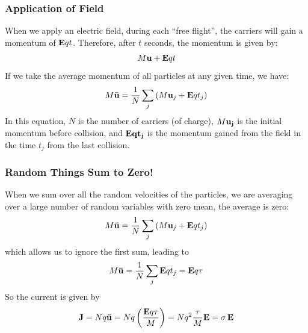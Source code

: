 \subsubsection{Application of Field}
When we apply an electric field, during each “free flight”, the carriers will gain a momentum of $ {\bf{E}}qt $.  Therefore, after $t$ seconds, the momentum is given by:
\begin{equation}
        M{\bf{u}} + {\bf{E}}qt
\end{equation}
If we take the average momentum of all particles at any given time, we have:
\begin{equation}
        M{\bf{\bar u}} = \frac{1}{N}\sum\limits_j {\left( {M{{\bf{u}}_j} + {\bf{E}}q{t_j}} \right)}
\end{equation}
In this equation, $ N $ is the number of carriers (of charge), $ M \bf{u}_j $ is the initial momentum before collision, and $\bf{E}q{t_j}$ is the momentum gained from the field in the time $t_j$ from the last collision.
\subsubsection{Random Things Sum to Zero!}
When we sum over all the random velocities of the particles, we are averaging over a large number of random variables with zero mean, the average is zero:
\begin{equation}
        M{\bf{\bar u}} = \frac{1}{N}\sum\limits_j {\left( {M{{\bf{u}}_j} + {\bf{E}}q{t_j}} \right)}
\end{equation}
which allows us to ignore the first sum, leading to
\begin{equation}
        M{\bf{\bar u}} = \frac{1}{N}\sum\limits_j {{\bf{E}}q{t_j}}  = {\bf{E}}q\tau
\end{equation}
So the current is given by
\begin{equation} {\bf{J}} = Nq{\bf{\bar u}} = Nq\left( {\frac{{{\bf{E}}q\tau }}{M}} \right) = N{q^2}\frac{\tau }{M}{\bf{E}} = \sigma \,{\bf{E}}
\end{equation}
